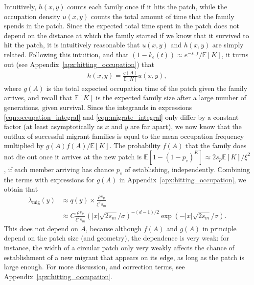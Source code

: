\documentclass{article}
\newcommand{\E}{\mathbb{E}}
\newcommand{\migrate}{\lambda_\text{mig}}
\begin{document}
Intuitively, $h(x,y)$ counts each family once if it hits the patch,
while the occupation density $u(x,y)$ counts the total amount of time that the family spends in the patch.
Since the expected total time spent in the patch does not depend on the distance at which the family started
if we know that it survived to hit the patch,
it is intuitively reasonable that $u(x,y)$ and $h(x,y)$ are simply related.
Following this intuition,
and that $(1-k_e(t)) \approx e^{-s_m t}/\E[K]$,
it turns out (see Appendix~\ref{apx:hitting_occupation}) that
\begin{align} 
  h(x,y) = \frac{ g(A) }{ \E[K] } u(x,y),
\end{align}
where $g(A)$ is the total expected occupation time of the patch given the family arrives,
and recall that $\E[K]$ is the expected family size after a large number of generations, given survival.
Since the integrands in expressions \ref{eqn:occupation_integral} and \ref{eqn:migrate_integral} only differ by a constant factor
(at least asymptotically as $x$ and $y$ are far apart),
we now know that the outflux of successful migrant families is equal to the mean occupation frequency
multiplied by $g(A) f(A) / \E[K]$.
The probability $f(A)$ that the family does not die out once it arrives at the new patch is
$\E[1-(1-p_e)^K] \approx 2 s_p \E[K] / \xi^2$,
if each member arriving has chance $p_e$ of establishing, independently.
Combining the terms with expressions for $g(A)$ in Appendix~\ref{apx:hitting_occupation},
we obtain that
\begin{align}
  \label{eqn:migrate}
  \migrate(y) &\approx q(y) \times \frac{ \rho s_p  }{ \xi^2 s_m }  \\
  &\approx C \frac{ \rho s_p  }{ \xi^2 s_m } \left( |x| \sqrt{2 s_m}/\sigma \right)^{-(d-1)/2} \exp( - |x| \sqrt{2 s_m} / \sigma) .
\end{align}
This does not depend on $A$, because although
$f(A)$ and $g(A)$ in principle depend on the patch size (and geometry),
the dependence is very weak:
for instance, the width of a circular patch only very weakly affects the chance 
of establishment of a new migrant that appears on its edge,
as long as the patch is large enough.
For more discussion, and correction terms, see Appendix~\ref{apx:hitting_occupation}.
\end{document}
